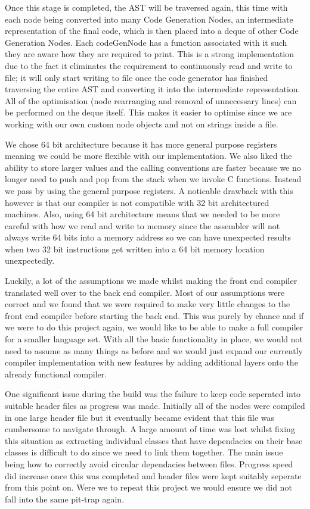 \documentclass[8pt, a4paper]{article}
\begin{document}
Once this stage is completed, the AST will be traversed again, this time with each node being converted into many Code Generation Nodes, an intermediate representation of the final code, which is then placed into a deque of other Code Generation Nodes. Each codeGenNode has a function associated with it such they are aware how they are required to print. This is a strong implementation due to the fact it eliminates the requirement to continuously read and write to file; it will only start writing to file once the code generator has finished traversing the entire AST and converting it into the intermediate representation. All of the optimisation (node rearranging and removal of unnecessary lines) can be performed on the deque itself. This makes it easier to optimise since we are working with our own custom node objects and not on strings inside a file.

We chose 64 bit architecture because it has more general purpose registers meaning we could be more flexible with our implementation. We also liked the ability to store larger values and the calling conventions are faster because we no longer need to push and pop from the stack when we invoke C functions. Instead we pass by using the general purpose registers. A noticable drawback with this however is that our compiler is not compatible with 32 bit architectured machines. Also, using 64 bit architecture means that we needed to be more careful with how we read and write to memory since the assembler will not always write 64 bits into a memory address so we can have unexpected results when two 32 bit instructions get written into a 64 bit memory location unexpectedly.

Luckily, a lot of the assumptions we made whilst making the front end compiler translated well over to the back end compiler. Most of our assumptions were correct and we found that we were required to make very little changes to the front end compiler before starting the back end. This was purely by chance and if we were to do this project again, we would like to be able to make a full compiler for a smaller language set. With all the basic functionality in place, we would not need to assume as many things as before and we would just expand our currently compiler implementation with new features by adding additional layers onto the already functional compiler.

One significant issue during the build was the failure to keep code seperated into suitable header files as progress was made. Initially all of the nodes were compiled in one large header file but it eventually became evident that this file was cumbersome to navigate through. A large amount of time was lost whilst fixing this situation as extracting individual classes that have dependacies on their base classes is difficult to do since we need to link them together. The main issue being how to correctly avoid circular dependacies between files. Progress speed did increase once this was completed and header files were kept suitably seperate from this point on. Were we to repeat this project we would ensure we did not fall into the same pit-trap again.
\end{document}
